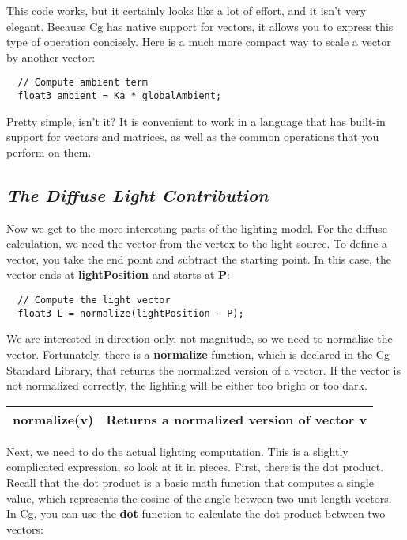 \documentclass[../main.tex]{subfiles}
\begin{document}
This code works, but it certainly looks like a lot of effort, and it isn't very elegant. Because Cg has native support for vectors, it allows you to express this type of operation concisely. Here is a much more compact way to scale a vector by another vector:

\FloatBarrier
\begin{lstlisting}
  // Compute ambient term
  float3 ambient = Ka * globalAmbient;
\end{lstlisting}
\FloatBarrier

Pretty simple, isn't it? It is convenient to work in a language that has built-in support for vectors and matrices, as well as the common operations that you perform on them.

\subsection*{\textit{The Diffuse Light Contribution}}

Now we get to the more interesting parts of the lighting model. For the diffuse calculation, we need the vector from the vertex to the light source. To define a vector, you take the end point and subtract the starting point. In this case, the vector ends at \textbf{lightPosition} and starts at \textbf{P}:

\FloatBarrier
\begin{lstlisting}
  // Compute the light vector
  float3 L = normalize(lightPosition - P);
\end{lstlisting}
\FloatBarrier

We are interested in direction only, not magnitude, so we need to normalize the vector. Fortunately, there is a \textbf{normalize} function, which is declared in the Cg Standard Library, that returns the normalized version of a vector. If the vector is not normalized correctly, the lighting will be either too bright or too dark.

\FloatBarrier
\begin{table}
\centering
\begin{tabular}{ p{5cm} p{7cm}  } 
\hline
\textbf{normalize(v)} & Returns a normalized version of vector \textbf{v} \\
\hline
\end{tabular}
\end{table}
\FloatBarrier

Next, we need to do the actual lighting computation. This is a slightly complicated expression, so look at it in pieces. First, there is the dot product. Recall that the dot product is a basic math function that computes a single value, which represents the cosine of the angle between two unit-length vectors. In Cg, you can use the \textbf{dot} function to calculate the dot product between two vectors:
\end{document}
